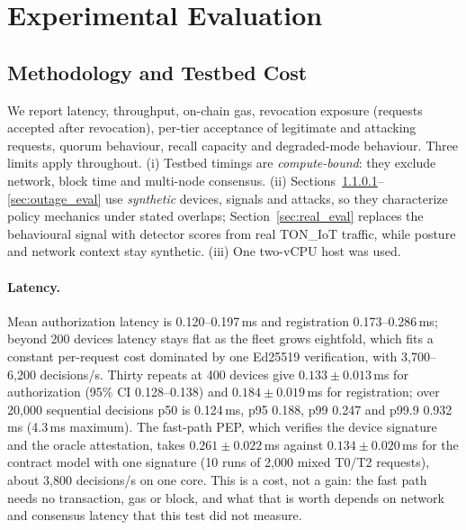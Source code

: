 \section{Experimental Evaluation}\label{sec:eval}

\subsection{Methodology and Testbed Cost}\label{sec:metrics}
We report latency, throughput, on-chain gas, revocation exposure (requests accepted after revocation), per-tier acceptance of legitimate and attacking requests, quorum behaviour, recall capacity and degraded-mode behaviour. Three limits apply throughout. (i) Testbed timings are \emph{compute-bound}: they exclude network, block time and multi-node consensus. (ii) Sections~\ref{sec:scaling}--\ref{sec:outage_eval} use \emph{synthetic} devices, signals and attacks, so they characterize policy mechanics under stated overlaps; Section~\ref{sec:real_eval} replaces the behavioural signal with detector scores from real TON\_IoT traffic, while posture and network context stay synthetic. (iii) One two-vCPU host was used.

\paragraph{Latency.}\label{sec:scaling} Mean authorization latency is 0.120--0.197\,ms and registration 0.173--0.286\,ms; beyond 200 devices latency stays flat as the fleet grows eightfold, which fits a constant per-request cost dominated by one Ed25519 verification, with 3{,}700--6{,}200 decisions/s. Thirty repeats at 400 devices give $0.133\pm0.013$\,ms for authorization (95\% CI 0.128--0.138) and $0.184\pm0.019$\,ms for registration; over 20{,}000 sequential decisions p50 is 0.124\,ms, p95 0.188, p99 0.247 and p99.9 0.932\,ms (4.3\,ms maximum). The fast-path PEP, which verifies the device signature and the oracle attestation, takes $0.261\pm0.022$\,ms against $0.134\pm0.020$\,ms for the contract model with one signature (10 runs of 2{,}000 mixed T0/T2 requests), about 3{,}800 decisions/s on one core. This is a cost, not a gain: the fast path needs no transaction, gas or block, and what that is worth depends on network and consensus latency that this test did not measure.

